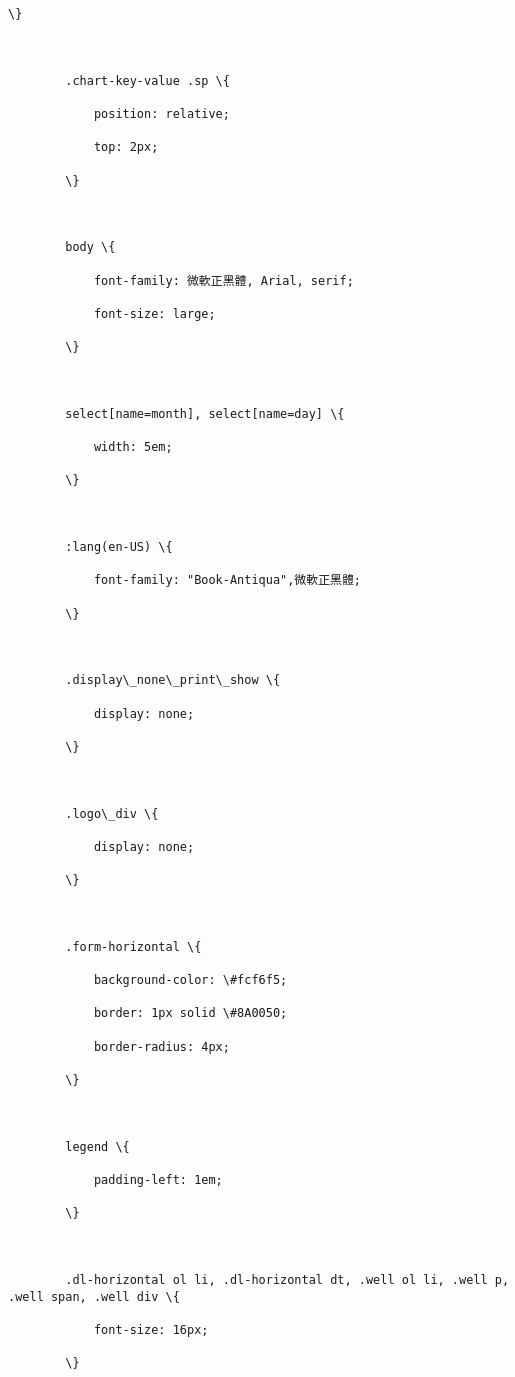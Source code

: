 \documentclass[11pt]{article}
\begin{document}
\begin{Verbatim}[commandchars=\\\{\}]
            \}



        .chart-key-value .sp \{

            position: relative;

            top: 2px;

        \}



        body \{

            font-family: 微軟正黑體, Arial, serif;

            font-size: large;

        \}



        select[name=month], select[name=day] \{

            width: 5em;

        \}



        :lang(en-US) \{

            font-family: "Book-Antiqua",微軟正黑體;

        \}



        .display\_none\_print\_show \{

            display: none;

        \}



        .logo\_div \{

            display: none;

        \}



        .form-horizontal \{

            background-color: \#fcf6f5;

            border: 1px solid \#8A0050;

            border-radius: 4px;

        \}



        legend \{

            padding-left: 1em;

        \}



        .dl-horizontal ol li, .dl-horizontal dt, .well ol li, .well p, .well span, .well div \{

            font-size: 16px;

        \}




\end{Verbatim}
\end{document}
